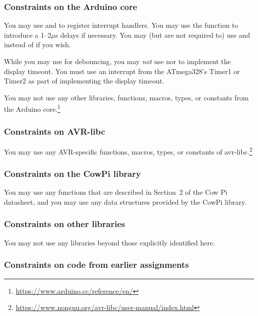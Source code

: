 \subsubsection{Constraints on the Arduino core}

You may use  and  to register interrupt handlers.
You may use the  function to introduce a 1--2$\mu$s delays if necessary.
You may (but are not required to) use  and  instead of  if you wish.

While you may use  for debouncing, you may \textit{not} use
 nor  to implement the display timeout.
You must use an interrupt from the ATmega328's Timer1 or Timer2 as part of
implementing the display timeout.

You may not use any other libraries, functions, macros, types, or constants from the Arduino core.\footnote{\url{https://www.arduino.cc/reference/en/}}

\subsubsection{Constraints on AVR-libc}

You may use any AVR-specific functions, macros, types, or constants of avr-libc.\footnote{\url{https://www.nongnu.org/avr-libc/user-manual/index.html}}

\subsubsection{Constraints on the CowPi library}

You may use any functions that are described in Section~2 of the Cow Pi
datasheet, and you may use any data structures provided by the CowPi library.

\subsubsection{Constraints on other libraries}

You may not use any libraries beyond those explicitly identified here.

\subsubsection{Constraints on code from earlier assignments}

